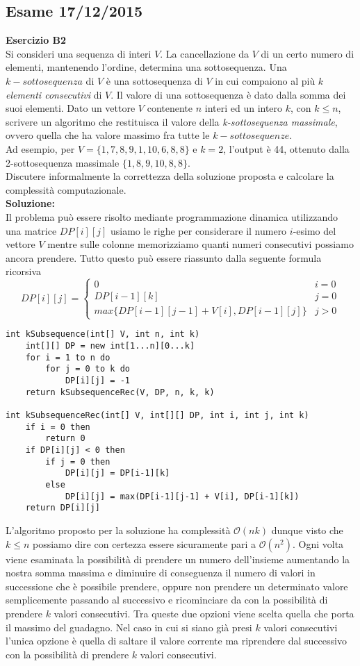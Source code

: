 \documentclass[../cheatSheetAlgoritmi.tex]{subfiles}
\begin{document}
\subsection{Esame 17/12/2015}
\textbf{Esercizio B2}\\
Si consideri una sequenza di interi $V$. La cancellazione da $V$ di un certo numero di elementi, mantenendo l'ordine, determina una sottosequenza. Una $k-sottosequenza$ di $V$ è una sottosequenza di $V$ in cui compaiono al più $k$ \emph{elementi consecutivi} di $V$. Il valore di una sottosequenza è dato dalla somma dei suoi elementi. Dato un vettore $V$ contenente $n$ interi ed un intero $k$, con $k \leq n$, scrivere un algoritmo che restituisca il valore della \emph{k-sottosequenza massimale}, ovvero quella che ha valore massimo fra tutte le $k-sottosequenze$.\\
Ad esempio, per $V=\{1,7,8,9,1,10,6,8,8\}$ e $k = 2$, l'output è 44, ottenuto dalla 2-sottosequenza massimale $\{1,8,9,10,8,8\}$.\\
Discutere informalmente la correttezza della soluzione proposta e calcolare la complessità computazionale.\\
\textbf{Soluzione:}\\
Il problema può essere risolto mediante programmazione dinamica utilizzando una matrice $DP[i][j]$ usiamo le righe per considerare il numero $i$-esimo del vettore $V$ mentre sulle colonne memorizziamo quanti numeri consecutivi possiamo ancora prendere. Tutto questo può essere riassunto dalla seguente formula ricorsiva
\begin{equation*}
  	DP[i][j]=\begin{cases}
  		0 & \text{$i = 0$}\\
  		DP[i-1][k] & \text{$j = 0$}\\
  		max\{DP[i-1][j-1] + V[i], DP[i-1][j]\} & \text{$j > 0$}
  	\end{cases}
\end{equation*}
\begin{lstlisting}[caption=k-sottosequenza contigua]
int kSubsequence(int[] V, int n, int k)
	int[][] DP = new int[1...n][0...k]
	for i = 1 to n do
		for j = 0 to k do
			DP[i][j] = -1
	return kSubsequenceRec(V, DP, n, k, k)
	
int kSubsequenceRec(int[] V, int[][] DP, int i, int j, int k)
	if i = 0 then 
		return 0
	if DP[i][j] < 0 then
		if j = 0 then
			DP[i][j] = DP[i-1][k]
		else
			DP[i][j] = max(DP[i-1][j-1] + V[i], DP[i-1][k])
	return DP[i][j]
\end{lstlisting}
L'algoritmo proposto per la soluzione ha complessità $\mathcal{O}(nk)$ dunque visto che $k \leq n$ possiamo dire con certezza essere sicuramente pari a $\mathcal{O}(n^{2})$. Ogni volta viene esaminata la possibilità di prendere un numero dell'insieme aumentando la nostra somma massima e diminuire di conseguenza il numero di valori in successione che è possibile prendere, oppure non prendere un determinato valore semplicemente passando al successivo e ricominciare da con la possibilità di prendere $k$ valori consecutivi. Tra queste due opzioni viene scelta quella che porta il massimo del guadagno. Nel caso in cui si siano già presi $k$ valori consecutivi l'unica opzione è quella di saltare il valore corrente ma riprendere dal successivo con la possibilità di prendere $k$ valori consecutivi.
\newpage
\end{document}

